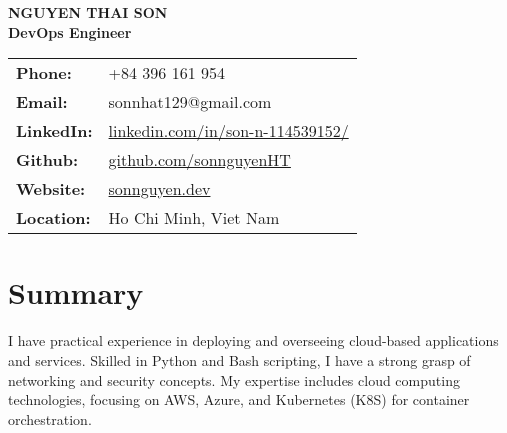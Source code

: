 \documentclass[a4paper,10pt]{article}
\begin{document}
\begin{center}
    {\Huge \textbf{NGUYEN THAI SON}} \\
    \vspace{6pt}
    \textbf{DevOps Engineer} \\
    \vspace{6pt}
    \begin{tabular}{ll}
        \textbf{Phone:} & +84 396 161 954 \\
        \textbf{Email:} & sonnhat129@gmail.com \\
        \textbf{LinkedIn:} & \href{https://www.linkedin.com/in/son-n-114539152/}{linkedin.com/in/son-n-114539152/} \\
        \textbf{Github:} & \href{https://github.com/sonnguyenHT}{github.com/sonnguyenHT} \\
        \textbf{Website:} & \href{https://thaisonhtportfolio.vercel.app/}{sonnguyen.dev} \\
        \textbf{Location:} & Ho Chi Minh, Viet Nam \\
    \end{tabular}
\end{center}

\vspace{10pt}
\section*{Summary}
I have practical experience in deploying and overseeing cloud-based applications and services. Skilled in Python and Bash scripting, I have a strong grasp of networking and security concepts. My expertise includes cloud computing technologies, focusing on AWS, Azure, and Kubernetes (K8S) for container orchestration.

\vspace{5pt}
\end{document}
